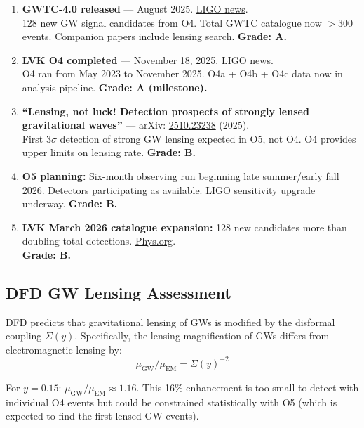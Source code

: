 \documentclass[11pt,a4paper]{article}
\begin{document}
\begin{enumerate}
\item \textbf{GWTC-4.0 released} --- August 2025. \href{https://www.ligo.caltech.edu/news/ligo20250826}{LIGO news}.\\
128 new GW signal candidates from O4. Total GWTC catalogue now $>$300 events. Companion papers include lensing search. \textbf{Grade: A.}

\item \textbf{LVK O4 completed} --- November 18, 2025. \href{https://www.ligo.caltech.edu/news/ligo20251118}{LIGO news}.\\
O4 ran from May 2023 to November 2025. O4a + O4b + O4c data now in analysis pipeline. \textbf{Grade: A (milestone).}

\item \textbf{``Lensing, not luck! Detection prospects of strongly lensed gravitational waves''} --- arXiv: \href{https://arxiv.org/abs/2510.23238}{2510.23238} (2025).\\
First $3\sigma$ detection of strong GW lensing expected in O5, not O4. O4 provides upper limits on lensing rate. \textbf{Grade: B.}

\item \textbf{O5 planning:} Six-month observing run beginning late summer/early fall 2026. Detectors participating as available. LIGO sensitivity upgrade underway. \textbf{Grade: B.}

\item \textbf{LVK March 2026 catalogue expansion:} 128 new candidates more than doubling total detections. \href{https://phys.org/news/2026-03-lvk-gravitational-candidates.html}{Phys.org}.\\
\textbf{Grade: B.}
\end{enumerate}

\subsection{DFD GW Lensing Assessment}

DFD predicts that gravitational lensing of GWs is modified by the disformal coupling $\Sigma(y)$. Specifically, the lensing magnification of GWs differs from electromagnetic lensing by:
\begin{equation}
\mu_\mathrm{GW} / \mu_\mathrm{EM} = \Sigma(y)^{-2}
\end{equation}

For $y = 0.15$: $\mu_\mathrm{GW} / \mu_\mathrm{EM} \approx 1.16$. This 16\% enhancement is too small to detect with individual O4 events but could be constrained statistically with O5 (which is expected to find the first lensed GW events).
\end{document}
